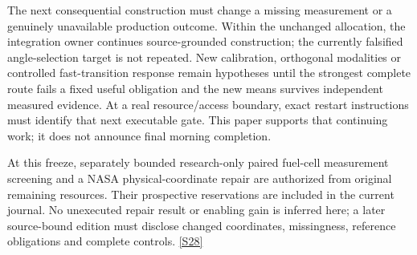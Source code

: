 \documentclass[11pt,letterpaper]{article}
\begin{document}
The next consequential construction must change a missing measurement or a genuinely unavailable production outcome. Within the unchanged allocation, the integration owner continues source-grounded construction; the currently falsified angle-selection target is not repeated. New calibration, orthogonal modalities or controlled fast-transition response remain hypotheses until the strongest complete route fails a fixed useful obligation and the new means survives independent measured evidence. At a real resource/access boundary, exact restart instructions must identify that next executable gate. This paper supports that continuing work; it does not announce final morning completion. \par
At this freeze, separately bounded research-only paired fuel-cell measurement screening and a NASA physical-coordinate repair are authorized from original remaining resources. Their prospective reservations are included in the current journal. No unexecuted repair result or enabling gain is inferred here; a later source-bound edition must disclose changed coordinates, missingness, reference obligations and complete controls. \href{https://github.com/MontrealAI/AGI-Alpha-Invention-Flywheel-Lab/blob/2b7a58e6e6593ae48da6f7f33865db94868c957f/campaign/overnight-008/economics/recovery/run008/CUMULATIVE_COST_RESOURCE.json}{[S28]}\par
\end{document}
